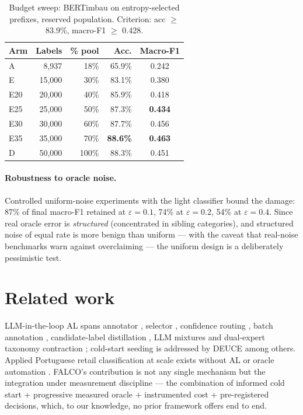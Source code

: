 \documentclass[11pt]{article}
\begin{document}
\begin{table}[htb]
\centering
\caption{Budget sweep: BERTimbau on entropy-selected prefixes, reserved
population. Criterion: acc $\ge$ 83.9\%, macro-F1 $\ge$ 0.428.}
\label{tab:sweep}
\small
\begin{tabular}{lrrrc}
\toprule
\textbf{Arm} & \textbf{Labels} & \textbf{\% pool} & \textbf{Acc.} & \textbf{Macro-F1} \\
\midrule
A   & 8{,}937  & 18\%  & 65.9\% & 0.242 \\
E   & 15{,}000 & 30\%  & 83.1\% & 0.380 \\
E20 & 20{,}000 & 40\%  & 85.9\% & 0.418 \\
E25 & 25{,}000 & 50\%  & 87.3\% & \textbf{0.434} \\
E30 & 30{,}000 & 60\%  & 87.7\% & 0.456 \\
E35 & 35{,}000 & 70\%  & \textbf{88.6\%} & \textbf{0.463} \\
D   & 50{,}000 & 100\% & 88.3\% & 0.451 \\
\bottomrule
\end{tabular}
\end{table}

\paragraph{Robustness to oracle noise.} Controlled uniform-noise
experiments with the light classifier bound the damage: 87\% of final
macro-F1 retained at $\varepsilon=0.1$, 74\% at $\varepsilon=0.2$, 54\%
at $\varepsilon=0.4$. Since real oracle error is \emph{structured}
(concentrated in sibling categories), and structured noise of equal rate
is more benign than uniform \citep{Frenay2014,Song2023NoisyLabels} ---
with the caveat that real-noise benchmarks warn against overclaiming
\citep{Merdjanovska2024NoiseBench,Raczkowska2024AlleNoise} --- the
uniform design is a deliberately pessimistic test.

\section{Related work}
\label{sec:related}

LLM-in-the-loop AL spans annotator \citep{Zhang2025}, selector
\citep{Bayer2024}, confidence routing \citep{Rouzegar2024}, batch
annotation \citep{Kholodna2024}, candidate-label distillation
\citep{Xia2025CanDist}, LLM mixtures \citep{Qi2026MixtureLLMs} and
dual-expert taxonomy contraction \citep{Cheng2024DualExpert}; cold-start
seeding is addressed by DEUCE \citep{Guo2025Deuce} among others. Applied
Portuguese retail classification at scale exists without AL or oracle
automation \citep{Machado2026RetailPt}. FALCO's contribution is not any
single mechanism but the integration under measurement discipline ---
the combination of informed cold start + progressive measured oracle +
instrumented cost + pre-registered decisions, which, to our knowledge,
no prior framework offers end to end.
\end{document}

